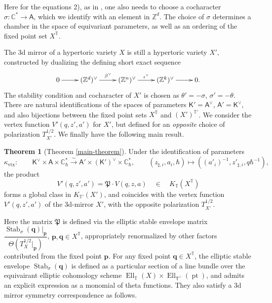 \documentclass[10pt]{amsart}
\theoremstyle{definition}
\def\ZZ{{\mathbb{Z}}}
\def\CC{{\mathbb{C}}}
\def\TT{\mathbb{T}}
\newcommand{\bp}{\mathbf{p}}
\newcommand{\bq}{\mathbf{q}}
\newcommand{\Ell}{\operatorname{Ell}}
\newcommand{\pt}{\operatorname{pt}}
\newcommand{\Stab}{\operatorname{Stab}}
\newcommand{\fP}{\mathfrak{P}}
\newcommand{\bA}{\mathsf{A}}
\newcommand{\bT}{\mathsf{T}}
\newcommand{\bK}{\mathsf{K}}
\theoremstyle{definition}
\numberwithin{equation}{section}
\theoremstyle{Theorem}
\newtheorem{Theorem}[Definition]{Theorem}
\begin{document}
Here for the equations 2), as in \cite{MO, Oko}, one also needs to choose a cocharacter $\sigma: \CC^* \to \bA$, which we identify with an element in $\ZZ^d$. The choice of $\sigma$ determines a chamber in the space of equivariant parameters, as well as an ordering of the fixed point set $X^\TT$. 

The 3d mirror of a hypertoric variety $X$ is still a hypertoric variety $X'$, constructed by dualizing the defining short exact sequence
$$
\xymatrix{
	0 \ar[r] & (\ZZ^d)^\vee \ar[r]^{\beta^\vee} & (\ZZ^n)^\vee \ar[r]^{\iota^\vee} & (\ZZ^k)^\vee \ar[r] & 0.
}
$$
The stability condition and cocharacter of $X'$ is chosen as $\theta' = -\sigma$, $\sigma' = -\theta$. There are natural identifications of the spaces of parameters $\bK' = \bA^\vee$, $\bA' = \bK^\vee$, and also bijections between the fixed point sets $X^\TT$ and $(X')^{\TT'}$. We consider the vertex function $V' (q, z', a')$ for $X'$, but defined for an \emph{opposite} choice of polarization $T^{1/2}_{X'}$. We finally have the following main result.

\begin{Theorem} [Theorem \ref{main-theorem}]
	Under the identification of parameters
	$$
	\kappa_{\mathrm{vtx}}:  \qquad \bK^\vee \times \bA \times \CC^*_\hbar \xrightarrow{\sim} \bA' \times (\bK')^\vee \times \CC^*_\hbar, \qquad ( z_{\sharp, i} , a_i, \hbar) \mapsto ( (a'_i)^{-1}, z'_{\sharp, i},  q \hbar^{-1}),
	$$	
	the product
	$$
	V'(q, z', a') = \fP \cdot V (q, z, a)  \quad \in \quad  K_\TT (X^\TT)
	$$
	forms a global class in $K_{\TT'} (X')$, and coincides with the vertex function $V'(q, z', a')$ of the 3d-mirror $X'$, with the opposite polarization $T^{1/2}_{X'}$.
\end{Theorem}

Here the matrix $\fP$ is defined via the elliptic stable envelope matrix $ \dfrac{\Stab_\sigma (\bq) |_\bp}{\Theta (T^{1/2}_X |_\bp ) }$, $\bp, \bq \in X^\TT$, appropriately renormalized by other factors contributed from the fixed point $\bp$. For any fixed point $\bq \in X^\TT$, the elliptic stable envelope $\Stab_\sigma (\bq)$ is defined as a particular section of a line bundle over the equivairant elliptic cohomology scheme $\Ell_\TT (X) \times \Ell_{\bT^\vee} (\pt)$, and admits an explicit expression as a monomial of theta functions. They also satisfy a 3d mirror symmetry correspondence as follows.
\end{document}
